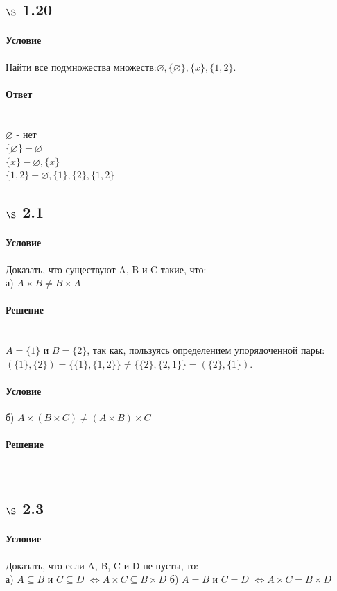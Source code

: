 \documentclass[a4paper,12pt]{article}
\begin{document}
\subsection*{$\S$ 1.20}
\paragraph*{Условие}
Найти все подмножества множеств:$\varnothing, \{ \varnothing \}, \{ x \}, \{1, 2\}. $
\paragraph*{Ответ} \mbox{}\\
$\varnothing $ - нет\\
$\{ \varnothing \} - \varnothing$\\
$\{ x \} - \varnothing, \{x\}$\\
$\{1, 2\} - \varnothing, \{1\}, \{2\}, \{1, 2\}$

\subsection*{$\S$ 2.1}
\paragraph*{Условие}
Доказать, что существуют A, B и C такие, что:\\
а) $A \times B \neq B \times A$
\paragraph*{Решение} \mbox{}\\
$A = \{1\}$ и $B = \{2\}$, так как, пользуясь определением упорядоченной пары: $ (\{1\},\{2\}) = \{\{1\},\{1,2\}\} \ne \{\{2\},\{2,1\}\} = (\{2\},\{1\})$.
\paragraph*{Условие}
б) $A \times (B \times C) \neq (A \times B) \times C$
\paragraph*{Решение} \mbox{}\\

\subsection*{$\S$ 2.3}
\paragraph*{Условие}
Доказать, что если A, B, C и D не пусты, то:\\
а) $A \subseteq B$ и $ C \subseteq D $ $\Leftrightarrow A \times C \subseteq B \times D$
б) $A = B$ и $ C = D $ $\Leftrightarrow A \times C = B \times D$
\end{document}
